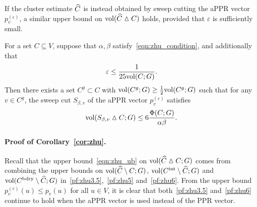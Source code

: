 If the cluster estimate $\widehat{C}$ is instead obtained by sweep cutting the aPPR vector $p_v^{(\varepsilon)}$, a similar upper bound on $\mathrm{vol}(\widehat{C} \vartriangle C)$ holds, provided that $\varepsilon$ is sufficiently small.
\begin{corollary}
	\label{cor:zhu}
	For a set $C \subseteq V$, suppose that $\alpha,\beta$ satisfy~\eqref{eqn:zhu_condition}, and additionally that 
	\begin{equation}
	\label{eqn:zhu_condition_2}
	\varepsilon \leq \frac{1}{25\mathrm{vol}(C;G)}.
	\end{equation}
	Then there exists a set $C^g \subset C$ with $\mathrm{vol}(C^g;G) \geq \frac{1}{2}\mathrm{vol}(C^g;G)$ such that for any $v \in C^g$, the sweep cut $S_{\beta,v}$ of the aPPR vector $p_v^{(\varepsilon)}$ satisfies
	\begin{equation}
	\label{eqn:zhu_ub_appr}
	\mathrm{vol}(S_{\beta,v} \vartriangle C;G) \leq 6\frac{\Phi(C;G)}{\alpha \beta}.
	\end{equation}
\end{corollary}

\paragraph{Proof of Corollary~\ref{cor:zhu}.}
	Recall that the upper bound~\eqref{eqn:zhu_ub} on $\mathrm{vol}(\widehat{C} \vartriangle C;G)$ comes from combining the upper bounds on $\mathrm{vol}(\widehat{C} \setminus C;G)$, $\mathrm{vol}(C^{\mathrm{int}} \setminus \widehat{C};G)$ and $\mathrm{vol}(C^{\mathrm{bdry}} \setminus \widehat{C};G)$ in~\eqref{pf:zhu3.5},~\eqref{pf:zhu5} and~\eqref{pf:zhu6}. From the upper bound $p_v^{(\varepsilon)}(u) \leq p_v(u)$ for all $u \in V$, it is clear that both~\eqref{pf:zhu3.5} and~\eqref{pf:zhu6} continue to hold when the aPPR vector is used instead of the PPR vector. 
	

